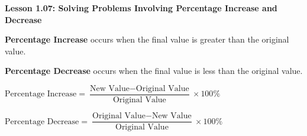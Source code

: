 \begin{center}
\textbf{Lesson 1.07: Solving Problems Involving Percentage Increase and Decrease}
\end{center}

\vspace*{-1.5ex}

\noindent \textbf{Percentage Increase} occurs when the final value is greater than the original value.

\noindent \textbf{Percentage Decrease} occurs when the final value is less than the original value.

{\centering $
    \text{Percentage Increase} = \dfrac{\text{New Value} - \text{Original Value}}{\text{Original Value}} \times 100\%
$\par}

{\centering $
    \text{Percentage Decrease} = \dfrac{\text{Original Value} - \text{New Value}}{\text{Original Value}} \times 100\%
$\par}

